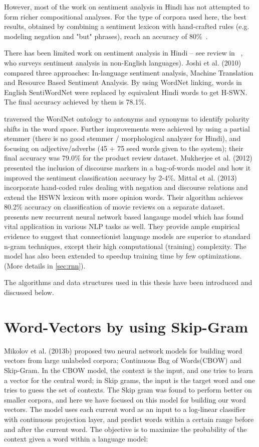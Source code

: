 \documentclass[11pt,a4paper]{article}
\begin{document}
However, most of the work on sentiment analysis in Hindi has not attempted to form richer compositional analyses.   For the type of corpora used here, the best results, obtained by combining a sentiment lexicon with hand-crafted rules (e.g. modeling negation and "but" phrases), reach an accuracy of 80\%~\cite{Mittal:13}.

There has been limited work on sentiment analysis in Hindi -- see review in
~\cite{Medagoda:13}, who surveys sentiment analysis in non-English languages). Joshi et al. (2010) compared three approaches: In-language sentiment
analysis, Machine Translation and Resource Based Sentiment Analysis. By using WordNet linking, words in English SentiWordNet were replaced by equivalent Hindi words to get H-SWN. The final accuracy achieved by them is 78.1\%.

\cite{Bakliwal:12}
traversed the WordNet ontology to antonyms and synonyms 
to identify polarity shifts in the word space. Further
improvements were achieved by using a partial stemmer (there is no good
stemmer / morphological analyzer for Hindi), and focusing on 
adjective/adverbs (45 + 75 seed words given to the system); their 
final accuracy was 79.0\% for the product review dataset. 
Mukherjee et al. (2012) presented the inclusion of discourse markers in a bag-of-words model and how it improved the sentiment classification accuracy by 2-4\%.  %
Mittal et al. (2013) incorporate hand-coded rules dealing with negation and discourse relations and extend the HSWN lexicon with more opinion words.  Their algorithm achieves  80.2\%
accuracy on classification of movie reviews on a separate dataset.\\

\cite{Mikolov:10} presents new recurrent neural network based langauge model which has found vital application in various NLP tasks as well. They provide ample empirical evidence to suggest that connectionist language models are superior to standard n-gram techniques, except their high computational (training) complexity. The model has also been extended to speedup training time by few optimizations.(More details in \ref{sec:rnn}).

The algorithms and data structures used in this thesis have been introduced and discussed below.
\section{Word-Vectors by using Skip-Gram}
\label{sec:skipgram}
Mikolov et al. (2013b) proposed two neural network models for building word vectors from large unlabeled corpora; Continuous Bag of Words(CBOW) and Skip-Gram.  In the CBOW model, the context is the input, and one tries to learn a vector for the central word; in Skip grams, the input is the target word and one tries to guess the set of contexts.  The Skip gram was found to perform better on smaller corpora, and here we have focused on this model for building our word vectors. The model uses each current word as an input to a log-linear classifier with continuous projection layer, and predict words within a certain range before and after the current word. The objective is to maximize the probability of the context given a word within a language model:
\end{document}
